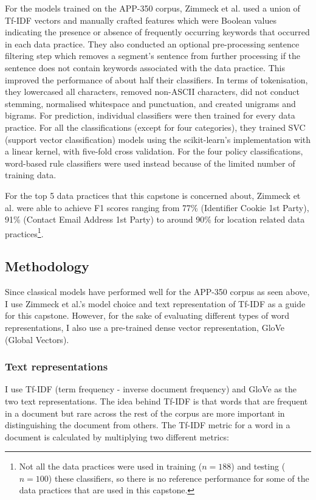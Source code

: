 For the models trained on the APP-350 corpus, Zimmeck et al. used a union of Tf-IDF vectors and manually crafted features which were Boolean values indicating the presence or absence of frequently occurring keywords that occurred in each data practice. They also conducted an optional pre-processing sentence filtering step which removes a segment's sentence from further processing if the sentence does not contain keywords associated with the data practice. This improved the performance of about half their classifiers. In terms of tokenisation, they lowercased all characters, removed non-ASCII characters, did not conduct stemming, normalised whitespace and punctuation, and created unigrams and bigrams. For prediction, individual classifiers were then trained for every data practice. For all the classifications (except for four categories), they trained SVC (support vector classification) models using the scikit-learn's implementation with a linear kernel, with five-fold cross validation. For the four policy classifications, word-based rule classifiers were used instead because of the limited number of training data.

For the top 5 data practices that this capstone is concerned about, Zimmeck et al. were able to achieve F1 scores ranging from 77\% (Identifier Cookie 1st Party), 91\% (Contact Email Address 1st Party) to around 90\% for location related data practices\footnote{Not all the data practices were used in training ($n = 188$) and testing ($n = 100$) these classifiers, so there is no reference performance for some of the data practices that are used in this capstone.}.

\subsection{Methodology}
Since classical models have performed well for the APP-350 corpus as seen above, I use Zimmeck et al.'s model choice and text representation of Tf-IDF as a guide for this capstone. However, for the sake of evaluating different types of word representations, I also use a pre-trained dense vector representation, GloVe (Global Vectors). 

\subsubsection{Text representations}
I use Tf-IDF (term frequency - inverse document frequency) and GloVe as the two text representations. The idea behind Tf-IDF is that words that are frequent in a document but rare across the rest of the corpus are more important in distinguishing the document from others. The Tf-IDF metric for a word in a document is calculated by multiplying two different metrics:

